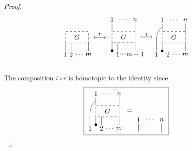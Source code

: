 \documentclass{amsart}
\renewcommand{\1}{\mathbf{1}}
\theoremstyle{definition}
\begin{document}
\begin{proof}
\begin{equation*}
{\begin{tikzpicture}[scale=.6]
		\draw [dashed] (0,0) rectangle (2,1); \node at (1, .5) {$G$};
		
		\draw (0,-.7) -- (0,0);
		\node at (0,-1) {$1$};
		\node at (.5,-1) {$2$}; \draw (.5,-.7) -- (.5,0);
		\node at (1.25,-1) {$\dots$};
		\node at (2,-1) {$m$}; \draw (2,-.7) -- (2,0);
		
		\node at (3,.75) {$r$}; \draw [|->] (2.5,.5) -- (3.5,.5);
		\end{tikzpicture}
		\   %
		\begin{tikzpicture}[scale=.6]
		\node at (0,2) {$1$}; \draw (0,1.7) -- (0,1);
		\node at (1,2) {$\dots$};
		\node at (2,2) {$n$}; \draw (2,1.7) -- (2,.9);
		
		\draw [dashed] (0,0) rectangle (2,1); \node at (1, .5) {$G$};
		
		\node at(0,-.7) {$\bullet$}; \draw (0,-.7) -- (0,0);
		\node at (.5,-1) {$1$}; \draw (.5,-.7) -- (.5,0);
		\node at (.9,-1) {$\cdot\!\cdot\!\cdot$};
		\node at (2,-1) {$m-1$}; \draw (2,-.7) -- (2,0);
		
		\node at (3,.75) {$i$}; \draw [|->] (2.5,.5) -- (3.5,.5);
		\end{tikzpicture}
		\begin{tikzpicture}[scale=.6]
		\node at (0,2) {$1$}; \draw (0,1.7) -- (0,1);
		\node at (1,2) {$\dots$};
		\node at (2,2) {$n$}; \draw (2,1.7) -- (2,.9);
		
		\draw [dashed] (0,0) rectangle (2,1); \node at (1, .5) {$G$};
		
		\node at (-.5,-1) {$1$}; \draw (-.5,-.7)  to[out=90,in=-140]  (0,1.4);
		\node at (0,-.7) {$\bullet$}; \draw (0,-.7) -- (0,0);
		\node at (.5,-1) {$2$}; \draw (.5,-.7) -- (.5,0);
		\node at (1.25,-1) {$\dots$};
		\node at (2,-1) {$m$}; \draw (2,-.7) -- (2,0);
		\end{tikzpicture}
	}
	\end{equation*}\\
	The composition $i \circ r$ is homotopic to the identity since
	\begin{equation*}
	\boxed{
		\begin{tikzpicture}[scale=.6]
		\node at (0,2) {$1$}; \draw (0,1.7) -- (0,1);
		\node at (1,2) {$\dots$};
		\node at (2,2) {$n$}; \draw (2,1.7) -- (2,.9);
		
		\draw [dashed] (0,0) rectangle (2,1); \node at (1, .5) {$G$};
		
		\node at (-.5,-1) {$1$}; \draw (-.5,-.7)  to[out=90,in=-140]  (0,1.4);
		\node at (0,-.7) {$\bullet$}; \draw (0,-.7) -- (0,0);
		\node at (.5,-1) {$2$}; \draw (.5,-.7) -- (.5,0);
		\node at (1.25,-1) {$\dots$};
		\node at (2,-1) {$m$}; \draw (2,-.7) -- (2,0);
		\node at (2.9,.5) {$=$}; 
		\end{tikzpicture}
		\begin{tikzpicture}[scale=.6]
		\node at (0,2) {$1$}; \draw (0,1.7) -- (0,1);
		\node at (1,2) {$\dots$};
		\node at (2,2) {$n$}; \draw (2,1.7) -- (2,.9);
		

\end{tikzpicture}}
\end{equation*}
\end{proof}
\end{document}
